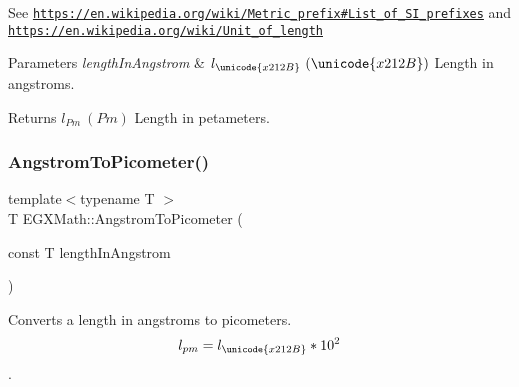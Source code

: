 See \href{https://en.wikipedia.org/wiki/Metric_prefix#List_of_SI_prefixes}{\tt https\+://en.\+wikipedia.\+org/wiki/\+Metric\+\_\+prefix\#\+List\+\_\+of\+\_\+\+S\+I\+\_\+prefixes} and \href{https://en.wikipedia.org/wiki/Unit_of_length}{\tt https\+://en.\+wikipedia.\+org/wiki/\+Unit\+\_\+of\+\_\+length} 
\begin{DoxyParams}{Parameters}
{\em length\+In\+Angstrom} & $ l_{\unicode{x212B}}\ (\unicode{x212B})$ Length in angstroms. \\
\hline
\end{DoxyParams}
\begin{DoxyReturn}{Returns}
$ l_{Pm}\ (Pm)$ Length in petameters. 
\end{DoxyReturn}
\mbox{\label{group___e_g_x_math-_conversions-_length_conversions-_non-_s_i-_angstrom-_s_i_ga59612970b9b51a1a900a76789ffaaf28}} 
\subsubsection{\texorpdfstring{Angstrom\+To\+Picometer()}{AngstromToPicometer()}}
{\footnotesize\ttfamily template$<$typename T $>$ \\
T E\+G\+X\+Math\+::\+Angstrom\+To\+Picometer (\begin{DoxyParamCaption}\item[{const T}]{length\+In\+Angstrom }\end{DoxyParamCaption})}



Converts a length in angstroms to picometers. \[ l_{pm}=l_{\unicode{x212B}} * 10^{2} \]. 

